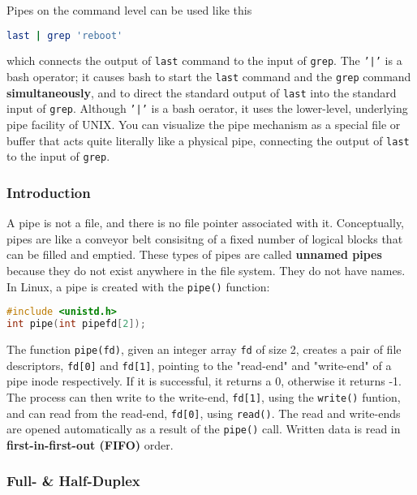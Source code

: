 \documentclass{article}
\newcommand{\bold}[1]{\textbf{#1}}
\newcommand{\code}[1]{\texttt{#1}}
\begin{document}
Pipes on the command level can be used like this

\begin{lstlisting}[language=bash]
last | grep 'reboot'
\end{lstlisting}

which connects the output of \code{last} command to the input of \code{grep}. The \code{'|'} is a bash operator; it causes bash to start the \code{last} command and the \code{grep} command \bold{simultaneously}, and to direct the standard output of \code{last} into the standard input of \code{grep}. Although \code{'|'} is a bash oerator, it uses the lower-level, underlying pipe facility of UNIX. You can visualize the pipe mechanism as a special file or buffer that acts quite literally like a physical pipe, connecting the output of \code{last} to the input of \code{grep}. 

\subsubsection{Introduction}

A pipe is not a file, and there is no file pointer associated with it. Conceptually, pipes are like a conveyor belt consisitng of a fixed number of logical blocks that can be filled and emptied. These types of pipes are called \bold{unnamed pipes} because they do not exist anywhere in the file system. They do not have names. In Linux, a pipe is created with the \code{pipe()} function: 

\begin{lstlisting}[language=C]
#include <unistd.h>
int pipe(int pipefd[2]);
\end{lstlisting}

The function \code{pipe(fd)}, given an integer array \code{fd} of size 2, creates a pair of file descriptors, \code{fd[0]} and \code{fd[1]}, pointing to the "read-end" and "write-end" of a pipe inode respectively. If it is successful, it returns a 0, otherwise it returns -1. The process can then write to the write-end, \code{fd[1]}, using the \code{write()} funtion, and can read from the read-end, \code{fd[0]}, using \code{read()}. The read and write-ends are opened automatically as a result of the \code{pipe()} call. Written data is read in \bold{first-in-first-out (FIFO)} order. 

\subsubsection{Full- \& Half-Duplex}
\end{document}
